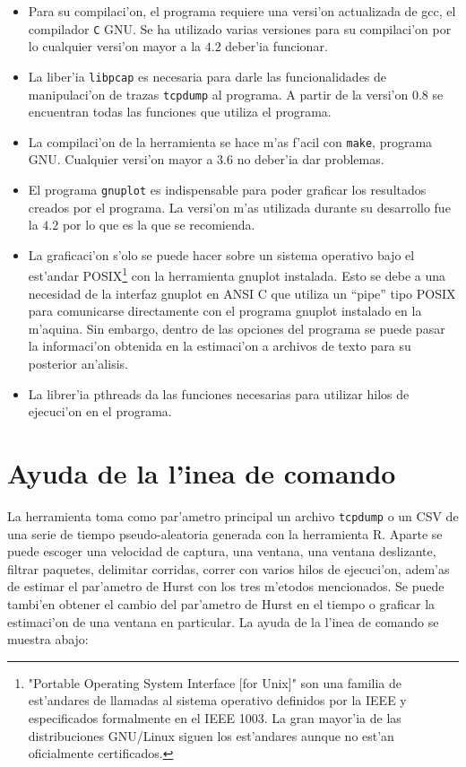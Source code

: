 \begin{itemize}
\item Para su compilaci'on, el programa requiere una versi'on actualizada de
gcc, el compilador {\tt C} GNU. Se ha utilizado varias versiones para su
compilaci'on por lo cualquier versi'on mayor a la $4.2$ deber'ia funcionar.
\item La liber'ia {\tt libpcap} es necesaria para darle las funcionalidades de
manipulaci'on de trazas {\tt tcpdump} al programa. A partir de la versi'on
$0.8$ se encuentran todas las funciones que utiliza el programa.
\item La compilaci'on de la herramienta se hace m'as f'acil con {\tt make},
programa GNU. Cualquier versi'on mayor a $3.6$ no deber'ia dar problemas.
\item El programa {\tt gnuplot} es indispensable para poder graficar los
resultados creados por el programa. La versi'on m'as utilizada durante su
desarrollo fue la $4.2$ por lo que es la que se recomienda.
\item La graficaci'on s'olo se puede hacer sobre un sistema operativo bajo el
est'andar POSIX\footnote{"Portable Operating System Interface [for Unix]" son
una familia de est'andares de llamadas al sistema operativo definidos por la
IEEE y especificados formalmente en el IEEE 1003. La gran mayor'ia de las
distribuciones GNU/Linux siguen los est'andares aunque no est'an
oficialmente certificados.} con la herramienta gnuplot instalada. Esto se debe
a una necesidad de la interfaz gnuplot en ANSI C que utiliza un ``pipe'' tipo
POSIX para comunicarse directamente con el programa gnuplot instalado en la
m'aquina. Sin embargo, dentro de las opciones del programa se puede pasar la
informaci'on obtenida en la estimaci'on a archivos de texto para su posterior
an'alisis.
\item La librer'ia pthreads da las funciones necesarias para utilizar hilos
de ejecuci'on en el programa.
\end{itemize}

\section{Ayuda de la l'inea de comando} \label{sect:ayuda}

La herramienta toma como par'ametro principal un archivo {\tt tcpdump} o un CSV
de una serie de tiempo pseudo-aleatoria generada con la herramienta R.
Aparte se puede escoger una velocidad de captura, una ventana, una ventana
deslizante, filtrar paquetes, delimitar corridas, correr con varios hilos de
ejecuci'on, adem'as de estimar el par'ametro de Hurst con los tres m'etodos
mencionados. Se puede tambi'en obtener el cambio del par'ametro de Hurst en el
tiempo o graficar la estimaci'on de una ventana en particular. La ayuda de la
l'inea de comando se muestra abajo:

